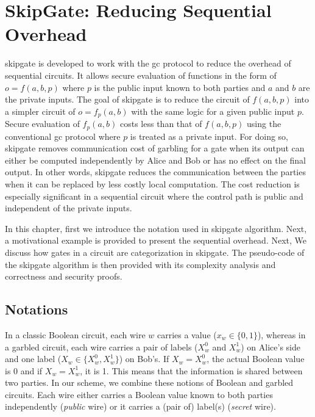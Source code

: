 \chapter{{SkipGate}: Reducing Sequential Overhead}\label{chap:skipgate}
\gls{skipgate} is developed to work with the \acrshort{gc} protocol to reduce the overhead of sequential circuits.
It allows secure evaluation of functions in the form of $o = f(a, b, p)$ where $p$ is the public input known to both parties and $a$ and $b$ are the private inputs.
The goal of \gls{skipgate} is to reduce the circuit of $f(a, b, p)$ into a simpler circuit of $o = f_p(a,b)$ with the same logic for a given public input $p$.
Secure evaluation of $f_p(a,b)$ costs less than that of $f(a, b, p)$ using the conventional \acrshort{gc} protocol where $p$ is treated as a private input.
For doing so, \gls{skipgate} removes communication cost of garbling for a gate when its output can either be computed independently by Alice and Bob or has no effect on the final output.
In other words, \gls{skipgate} reduces the communication between the parties when it can be replaced by less costly local computation.
The cost reduction is especially significant in a sequential circuit where the control path is public and independent of the private inputs.

In this chapter, first we introduce the notation used in \gls{skipgate} algorithm.
Next, a motivational example is provided to present the sequential overhead.
Next, We discuss how gates in a circuit are categorization in \gls{skipgate}.
The pseudo-code of the \gls{skipgate} algorithm is then provided with its complexity analysis and correctness and security proofs.

\section{Notations}\label{sec:skipgate-notation}
In a classic Boolean circuit, each wire $w$ carries a value ($x_w\in\{0, 1\}$), whereas in a garbled circuit, each wire carries a pair of labels ($X_w^{0}$ and $X_w^{1}$) on Alice's side and one label ($X_w \in \{X_w^{0}, X_w^{1}\}$) on Bob's.
If $X_w = X_w^{0}$, the actual Boolean value is 0 and if $X_w = X_w^{1}$, it is 1.
This means that the information is shared between two parties.
In our scheme, we combine these notions of Boolean and garbled circuits.
Each wire either carries a Boolean value known to both parties independently (\textit{public} wire) or it carries a (pair of) label(s) (\textit{secret} wire).

